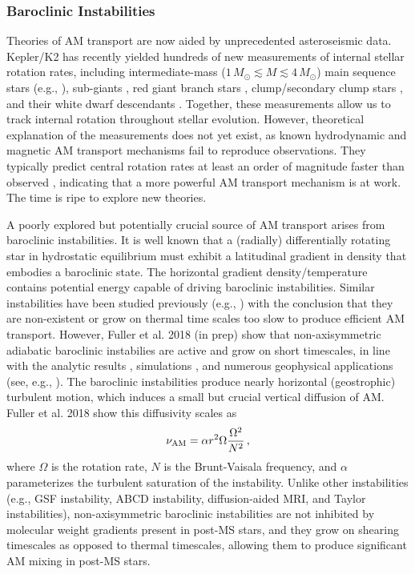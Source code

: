 \subsubsection{Baroclinic Instabilities}
\label{baroclinic}


Theories of AM transport are now aided by unprecedented asteroseismic data. Kepler/K2 has recently yielded hundreds of new measurements of internal stellar rotation rates, including intermediate-mass ($1 \, M_\odot \! \lesssim \! M \! \lesssim \! 4 \, M_\odot$) main sequence stars (e.g., \citealt{benomar:15,vanreeth:16}), sub-giants \citep{deheuvels:14}, red giant branch stars \citep{beck:12,mosser:12}, clump/secondary clump stars \citep{mosser:12,deheuvels:15}, and their white dwarf descendants \citep{hermes:17}. Together, these measurements allow us to track internal rotation throughout stellar evolution. However, theoretical explanation of the measurements does not yet exist, as known hydrodynamic and magnetic AM transport mechanisms fail to reproduce observations. They typically predict central rotation rates at least an order of magnitude faster than observed \citep{cantiello:14}, indicating that a more powerful AM transport mechanism is at work. The time is ripe to explore new theories.

A poorly explored but potentially crucial source of AM transport arises from baroclinic instabilities. It is well known that a (radially) differentially rotating star in hydrostatic equilibrium must exhibit a latitudinal gradient in density that embodies a baroclinic state. The horizontal gradient density/temperature contains potential energy capable of driving baroclinic instabilities. Similar instabilities have been studied previously (e.g., \citealt{goldreich:67,knobloch:82,knobloch:83,spruit:83,spruit:84,zahn:93}) with the conclusion that they are non-existent or grow on thermal time scales too slow to produce efficient AM transport. However, Fuller et al. 2018 (in prep) show that non-axisymmetric adiabatic baroclinic instabilies are active and grow on short timescales, in line with the analytic results \citep{tassoul:82,fujimoto:87,fujimoto:88}, simulations \cite{simitev:17}, and numerous geophysical applications (see, e.g., \citealt{pedlosky:92}). The baroclinic instabilities produce nearly horizontal (geostrophic) turbulent motion, which induces a small but crucial vertical diffusion of AM. Fuller et al. 2018 show this diffusivity scales as
\begin{equation}
\label{numri} 
\nu_{\rm AM} = \alpha r^2 \Omega \frac{\Omega^2}{N^2} \, ,
\end{equation}
where $\Omega$ is the rotation rate, $N$ is the Brunt-Vaisala frequency, and $\alpha$ parameterizes the turbulent saturation of the instability. Unlike other instabilities (e.g., GSF instability, ABCD instability, diffusion-aided MRI, and Taylor instabilities), non-axisymmetric baroclinic instabilities are not inhibited by molecular weight gradients present in post-MS stars, and they grow on shearing timescales as opposed to thermal timescales, allowing them to produce significant AM mixing in post-MS stars.





